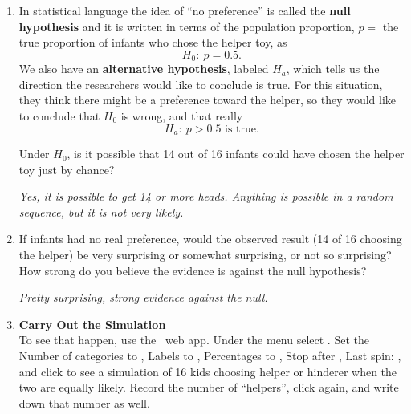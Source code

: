 \begin{enumerate}
\begin{key}
       {\it   That they are just picking one toy at random with no
         real preference for the helper or hinderer.}
\end{key}

   \item In statistical language the idea of ``no preference'' is
     called the {\bf null hypothesis}  and it is written in terms of
     the population proportion, $p=$ the true proportion of infants
     who chose the helper toy, as
      $$ H_0:\ p = 0.5.$$
     We also have an {\bf alternative hypothesis}, labeled $H_a$,
     which tells us the direction the researchers would like to
     conclude is true.  For this situation, they think there might be
     a preference toward the helper, so they would like to conclude
     that $H_0$ is wrong, and that really 
       $$H_a: \ p > 0.5 \mbox{ is true.}$$

     Under $H_0$,  is it possible that 14 out of 16
      infants could have chosen the helper toy just by chance? 
\begin{students}
  \vspace{1cm}
\end{students}

\begin{key}
{\it Yes, it is possible to get 14 or more heads. Anything is
  possible in a random sequence, but it is not very likely. }
\end{key}

\item If infants had no real preference, would the observed result (14
  of 16 choosing the helper) be very surprising or somewhat
  surprising, or not so surprising? How strong do you believe the
  evidence is against the null hypothesis?
\begin{students}
  \vspace{2cm}
\end{students}

\begin{key}
{\it Pretty surprising, strong evidence against the null.}
\end{key}


  \item         {\bf Carry Out the Simulation}\\
     To see that happen, use the
     \webAppURLFrst\  web app. Under
     the  menu select .  Set the  
        Number of categories to , Labels to ,
        Percentages to , Stop after , Last spin: , and click  to
        see a simulation of 16 kids choosing helper or hinderer when
        the two are equally likely. Record the number of ``helpers'',
        click  again, and write down that number as well.
\begin{students}
  \vspace{1.5cm}
\end{students}


\end{enumerate}
